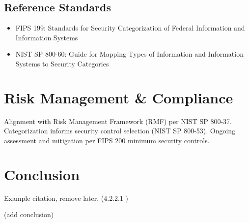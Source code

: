 \documentclass{article}
\begin{document}
\subsection{Reference Standards}
\begin{itemize}
    \item FIPS 199: Standards for Security Categorization of Federal Information and Information Systems
    \item NIST SP 800-60: Guide for Mapping Types of Information and Information Systems to Security Categories
\end{itemize}


\section{Risk Management \& Compliance}
\par Alignment with Risk Management Framework (RMF) per NIST SP 800-37. 
Categorization informs security control selection (NIST SP 800-53). 
Ongoing assessment and mitigation per FIPS 200 minimum security controls.

\section{Conclusion}
\par Example citation, remove later. (4.2.2.1 \cite{fips199})
\par (add conclusion)



{}
\end{document}
